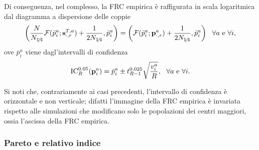                 Di conseguenza, nel complesso, la FRC empirica è raffigurata in scala logaritmica dal diagramma a dispersione delle coppie
                \begin{equation*}
                    \left(
                        \frac N{N_{1\hspace{-0.15em}/\hspace{-0.15em}4}}\mathcal F(\bar p^a_i;\mathbf s^{T,a}_{\cdot,r})
                        +\frac1{2N_{1\hspace{-0.15em}/\hspace{-0.15em}4}},\bar p^a_i
                    \right)
                    =\left(
                        \mathcal F(\bar p^a_i;\mathbf p^a_{\cdot,r})
                        +\frac1{2N_{1\hspace{-0.15em}/\hspace{-0.15em}4}},\bar p^a_i
                    \right)
                    \ \ \forall a\text{ e }\forall i,
                \end{equation*}
                ove \(\bar p^a_i\) viene dagl'intervalli di confidenza
                \begin{equation*}
                    \operatorname{IC}_R^{0.05}(\mathbf p^a_i)=
                    \bar p^a_i\pm t^{0.025}_{R-1}\sqrt{\frac{v^a_i}R},
                    \ \ \forall a\text{ e }\forall i.
                \end{equation*}
                \begin{oss}
                    Si noti che, contrariamente ai casi precedenti, l'intervallo di confidenza è orizzontale e non verticale; difatti l'immagine della FRC empirica è invariata rispetto alle simulazioni che modificano solo le popolazioni dei centri maggiori, ossia l'ascissa della FRC empirica.
                \end{oss}

            \subsubsection{Pareto e relativo indice}


